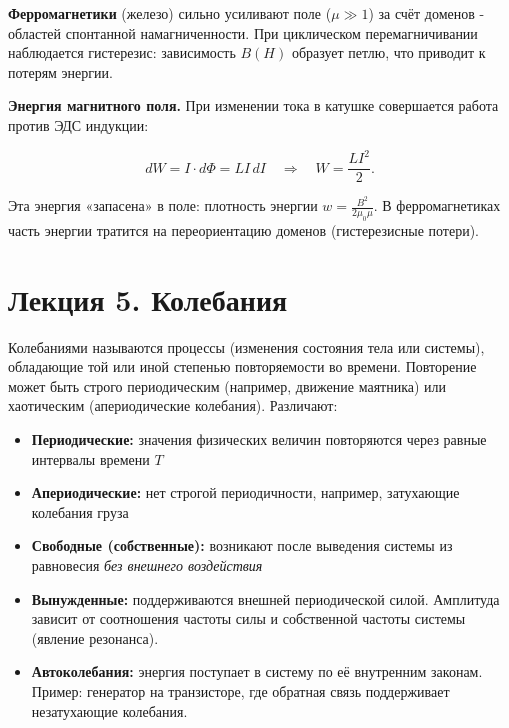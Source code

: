 \documentclass[12pt]{article}
\begin{document}
\textbf{Ферромагнетики} (железо) сильно усиливают поле ($\mu \gg 1$) за счёт доменов - 
областей спонтанной намагниченности. При циклическом перемагничивании наблюдается гистерезис: 
зависимость $B(H)$ образует петлю, что приводит к потерям энергии.

\vspace{0.5cm}

\noindent\textbf{Энергия магнитного поля.} При изменении тока в катушке совершается работа против ЭДС индукции:

\[
    dW = I \cdot d\Phi = L I \, dI \quad \Rightarrow \quad W = \frac{LI^2}{2}.
\]

Эта энергия «запасена» в поле: плотность энергии $w = \frac{B^2}{2\mu_0\mu}$. 
В ферромагнетиках часть энергии тратится на переориентацию доменов (гистерезисные потери).






\section{Лекция 5. Колебания}

Колебаниями называются процессы (изменения состояния тела или системы), 
обладающие той или иной степенью повторяемости во времени. 
Повторение может быть строго периодическим (например, движение маятника) 
или хаотическим (апериодические колебания). Различают:

\begin{itemize}
    \item \textbf{Периодические:} значения физических величин повторяются через равные интервалы времени $T$
    
    \item \textbf{Апериодические:} нет строгой периодичности, например, затухающие колебания груза

    \item \textbf{Свободные (собственные):} возникают после выведения системы из равновесия \textit{без внешнего воздействия}
    
    \item \textbf{Вынужденные:} поддерживаются внешней периодической силой. Амплитуда зависит от соотношения частоты силы и собственной частоты системы (явление резонанса).
    
    \item \textbf{Автоколебания:} энергия поступает в систему по её внутренним законам. Пример: генератор на транзисторе, где обратная связь поддерживает незатухающие колебания.
\end{itemize}
\end{document}

